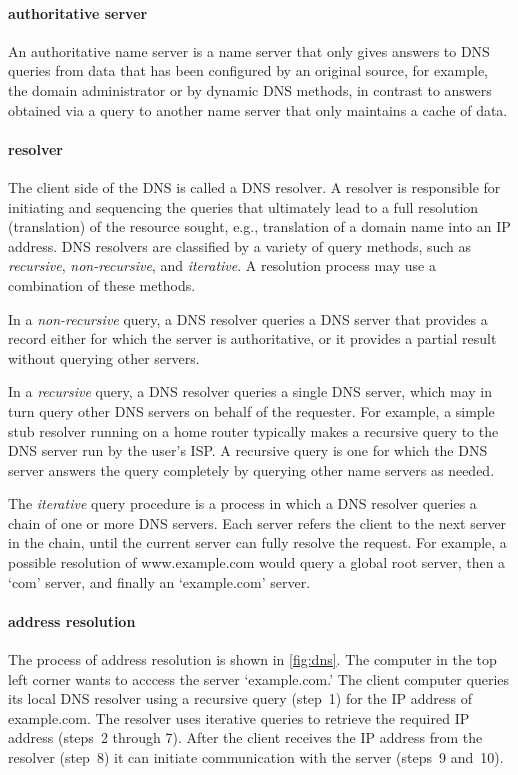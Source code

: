 \paragraph{authoritative server}
An authoritative name server is a name server that only gives answers to \acs{DNS} queries from data that has been configured by an original source, for example, the domain administrator or by dynamic \acs{DNS} methods, in contrast to answers obtained via a query to another name server that only maintains a cache of data.

\paragraph{resolver}
The client side of the \acs{DNS} is called a \acs{DNS} resolver.
A resolver is responsible for initiating and sequencing the queries that ultimately lead to a full resolution (translation) of the resource sought, e.g., translation of a domain name into an \acs{IP} address.
\acs{DNS} resolvers are classified by a variety of query methods, such as \emph{recursive}, \emph{non-recursive}, and \emph{iterative}.
A resolution process may use a combination of these methods.

In a \emph{non-recursive} query, a \acs{DNS} resolver queries a \acs{DNS} server that provides a record either for which the server is authoritative, or it provides a partial result without querying other servers.

In a \emph{recursive} query, a \acs{DNS} resolver queries a single \acs{DNS} server, which may in turn query other \acs{DNS} servers on behalf of the requester.
For example, a simple stub resolver running on a home router typically makes a recursive query to the \acs{DNS} server run by the user's \acs{ISP}.
A recursive query is one for which the \acs{DNS} server answers the query completely by querying other name servers as needed.

The \emph{iterative} query procedure is a process in which a \acs{DNS} resolver queries a chain of one or more \acs{DNS} servers.
Each server refers the client to the next server in the chain, until the current server can fully resolve the request.
For example, a possible resolution of www.ex\-am\-ple.com would query a global root server, then a `com' server, and finally an `example.com' server.


\paragraph{address resolution}
The process of address resolution is shown in \vref{fig:dns}.
The computer in the top left corner wants to acccess the server `example.com.'
The client computer queries its local \acs{DNS} resolver using a recursive query (step~1) for the \acs{IP} address of example.com.
The resolver uses iterative queries to retrieve the required \acs{IP} address (steps~2 through 7).
After the client receives the \acs{IP} address from the resolver (step~8) it can initiate communication with the server (steps~9 and~10).


